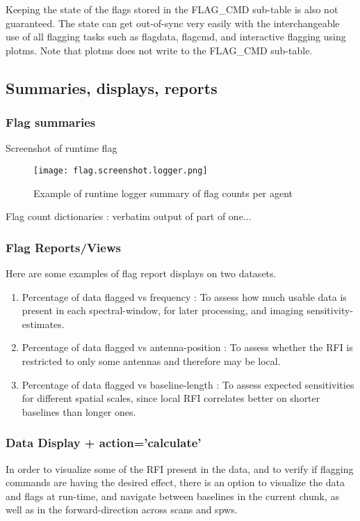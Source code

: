 Keeping the state of the flags stored in the FLAG\_CMD sub-table is also not
guaranteed. The state can get out-of-sync very easily with the interchangeable
use of all flagging tasks such as flagdata, flagcmd, and interactive
flagging using plotms. Note that plotms does not write to the FLAG\_CMD
sub-table.


\subsection{Summaries, displays, reports}

\subsubsection{Flag summaries}

Screenshot of runtime flag 
\begin{figure}
\texttt{[image: flag.screenshot.logger.png]}
\caption{Example of runtime logger summary of flag counts per agent}
\end{figure}

Flag count dictionaries : {\red verbatim output of part of one...}



\subsubsection{Flag Reports/Views}

Here are some examples of flag report displays on two datasets.
\begin{enumerate}
\item Percentage of data flagged vs frequency : To assess how much usable data is present in each spectral-window, for later processing, and imaging sensitivity-estimates.
\item Percentage of data flagged vs antenna-position : To assess whether the RFI is restricted to only some antennas and therefore may be local.
\item Percentage of data flagged vs baseline-length : To assess expected sensitivities for different spatial scales, since local RFI correlates better on shorter baselines than longer ones.
\end{enumerate}

\subsubsection{Data Display + action='calculate'}
In order to visualize some of the RFI present in the data, and to verify if flagging
commands are having the desired effect,  there is an option to 
visualize the data and flags at run-time, and navigate between baselines in the 
current chunk, as well as in the forward-direction across scans and spws.   

